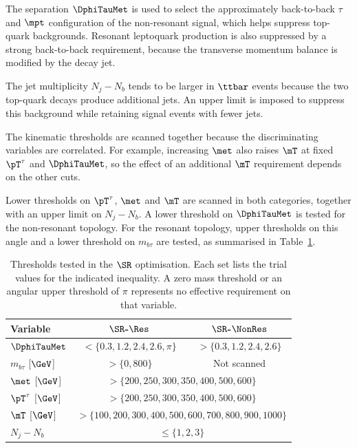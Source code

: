 The separation $\DphiTauMet$ is used to select the approximately back-to-back $\tau$ and $\mpt$ configuration of the non-resonant signal, which helps suppress top-quark backgrounds.
Resonant leptoquark production is also suppressed by a strong back-to-back requirement, because the transverse momentum balance is modified by the decay jet.

The jet multiplicity $N_j-N_b$ tends to be larger in $\ttbar$ events because the two top-quark decays produce additional jets.
An upper limit is imposed to suppress this background while retaining signal events with fewer jets.

The kinematic thresholds are scanned together because the discriminating variables are correlated.
For example, increasing $\met$ also raises $\mT$ at fixed $\pT^\tau$ and $\DphiTauMet$, so the effect of an additional $\mT$ requirement depends on the other cuts.

Lower thresholds on $\pT^\tau$, $\met$ and $\mT$ are scanned in both categories, together with an upper limit on $N_j-N_b$.
A lower threshold on $\DphiTauMet$ is tested for the non-resonant topology.
For the resonant topology, upper thresholds on this angle and a lower threshold on $m_{b\tau}$ are tested, as summarised in Table~\ref{tab:ch7_scan_variables}.

\begin{table}[htbp]
    \centering
    \small
    \caption{Thresholds tested in the $\SR$ optimisation. Each set lists the trial values for the indicated inequality. A zero mass threshold or an angular upper threshold of $\pi$ represents no effective requirement on that variable.}
    \label{tab:ch7_scan_variables}
    \begin{tabular}{lcc}
        \toprule
        Variable & $\SR$-$\Res$ & $\SR$-$\NonRes$ \\
        \midrule
        $\DphiTauMet$ & $<\{0.3,1.2,2.4,2.6,\pi\}$ & $>\{0.3,1.2,2.4,2.6\}$ \\
        $m_{b\tau}$ [$\GeV$] & $>\{0,800\}$ & Not scanned \\
        $\met$ [$\GeV$] & \multicolumn{2}{c}{$>\{200,250,300,350,400,500,600\}$} \\
        $\pT^\tau$ [$\GeV$] & \multicolumn{2}{c}{$>\{200,250,300,350,400,500,600\}$} \\
        $\mT$ [$\GeV$] & \multicolumn{2}{c}{$>\{100,200,300,400,500,600,700,800,900,1000\}$} \\
        $N_j-N_b$ & \multicolumn{2}{c}{$\leq\{1,2,3\}$} \\
        \bottomrule
    \end{tabular}
\end{table}

